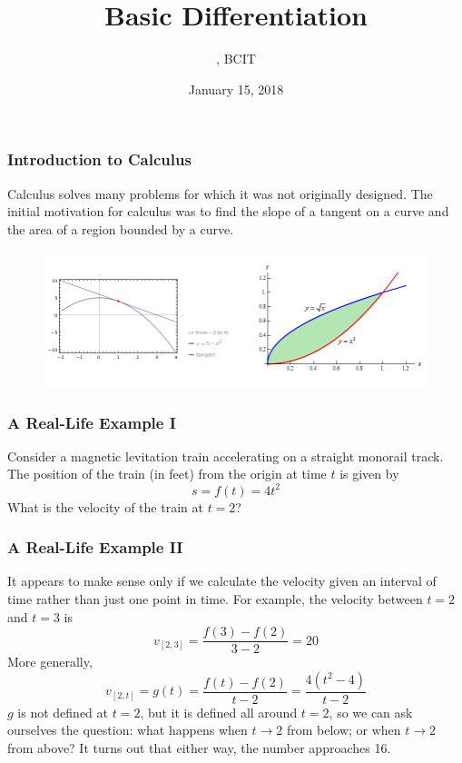 \documentclass[xcolor=dvipsnames]{beamer}
\title{Basic Differentiation}
\subtitle{{\CourseNumber}, BCIT}
\author{\CourseName}
\date{January 15, 2018}
\begin{document}
\begin{frame}
  \titlepage
\end{frame}

\begin{frame}
  \frametitle{Introduction to Calculus}
\alert{Calculus} solves many problems for which it was not originally
designed. The initial motivation for calculus was to find the slope of
a tangent on a curve and the area of a region bounded by a curve.
  \begin{figure}[h]
    \includegraphics[scale=.35]{./diagrams/regiontangent.png}
  \end{figure}
\end{frame}

\begin{frame}
  \frametitle{A Real-Life Example I}
Consider a magnetic levitation train accelerating on a straight
monorail track. The position of the train (in feet) from the origin at
time $t$ is given by
\begin{equation}
  \label{eq:pupibahk}
  s=f(t)=4t^{2}
\end{equation}
What is the velocity of the train at $t=2$?
\end{frame}

\begin{frame}
  \frametitle{A Real-Life Example II}
It appears to make sense only if we calculate the velocity given an
interval of time rather than just one point in time. For example, the
velocity between $t=2$ and $t=3$ is 
\begin{equation}
  \label{eq:einohkie}
  v_{[2,3]}=\frac{f(3)-f(2)}{3-2}=20
\end{equation}
More generally,
\begin{equation}
  \label{eq:phaedais}
  v_{[2,t]}=g(t)=\frac{f(t)-f(2)}{t-2}=\frac{4(t^{2}-4)}{t-2}
\end{equation}
$g$ is not defined at $t=2$, but it is defined all around $t=2$, so we
can ask ourselves the question: what happens when $t\rightarrow{}2$
from below; or when $t\rightarrow{}2$ from above? It turns out that
either way, the number approaches 16.
\end{frame}
\end{document}
